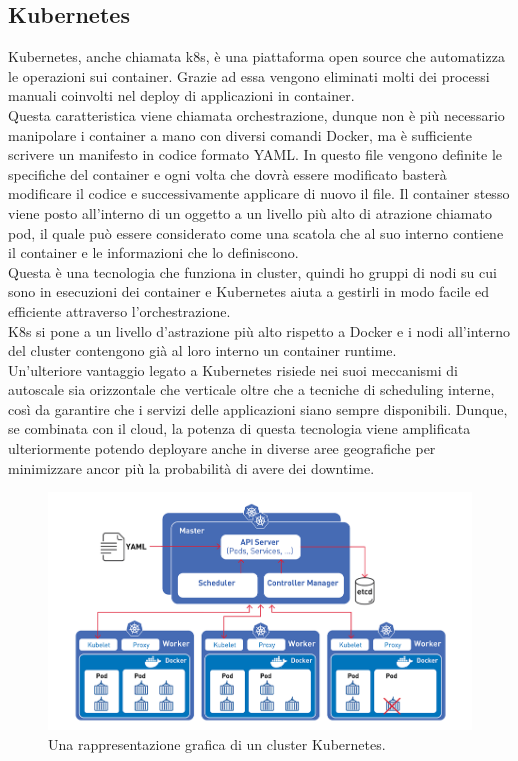 \documentclass[a4paper,12pt]{report}
\begin{document}
\subsection{Kubernetes}
Kubernetes, anche chiamata k8s, è una piattaforma open source che automatizza le operazioni sui container. Grazie ad essa vengono eliminati molti dei processi manuali coinvolti nel deploy di applicazioni in container. \\
Questa caratteristica viene chiamata orchestrazione, dunque non è più necessario manipolare i container a mano con diversi comandi Docker, ma è sufficiente scrivere un manifesto in codice formato YAML. In questo file vengono definite le specifiche del container e ogni volta che dovrà essere modificato basterà modificare il codice e successivamente applicare di nuovo il file. Il container stesso viene posto all'interno di un oggetto a un livello più alto di atrazione chiamato pod, il quale può essere considerato come una scatola che al suo interno contiene il container e le informazioni che lo definiscono.\\
Questa è una tecnologia che funziona in cluster, quindi ho gruppi di nodi su cui sono in esecuzioni dei container e Kubernetes aiuta a gestirli in modo facile ed efficiente attraverso l'orchestrazione.\\
K8s si pone a un livello d'astrazione più alto rispetto a Docker e i nodi all'interno del cluster contengono già al loro interno un container runtime.\cite{kubernetes}\\ 
Un'ulteriore vantaggio legato a Kubernetes risiede nei suoi meccanismi di autoscale sia orizzontale che verticale oltre che a tecniche di scheduling interne, così da garantire che i servizi delle applicazioni siano sempre disponibili. Dunque, se combinata con il cloud, la potenza di questa tecnologia viene amplificata ulteriormente potendo deployare anche in diverse aree geografiche per minimizzare ancor più la probabilità di avere dei downtime.\\
\begin{figure}[h]
	\includegraphics[width=1.0\textwidth]{k8s}
    \caption{Una rappresentazione grafica di un cluster Kubernetes. \cite{k8simg}}
    \label{fig:k8s}
\end{figure}
\end{document}

